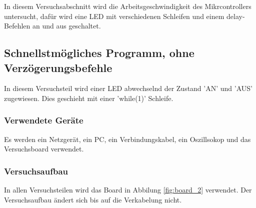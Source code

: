 \documentclass[12pt,a4paper]{article}
\begin{document}
In diesem Versuchsabschnitt wird die Arbeitsgeschwindigkeit des Mikrcontrollers untersucht, dafür wird eine LED mit verschiedenen Schleifen und einem delay-Befehlen an und aus geschaltet.

\subsection{Schnellstmögliches Programm, ohne Verzögerungsbefehle}

In diesem Versuchsteil wird einer LED abwechselnd der Zustand 'AN' und 'AUS' zugewiesen. Dies geschieht mit einer 'while(1)' Schleife.

\subsubsection*{Verwendete Geräte}

Es werden ein Netzgerät, ein PC, ein Verbindungskabel, ein Oszillsokop und das Versuchsboard verwendet.

\subsubsection*{Versuchsaufbau}

In allen Versuchsteilen wird das Board in Abbilung \ref{fig:board_2} verwendet. Der Versuchsaufbau ändert sich bis auf die Verkabelung nicht.
\end{document}

